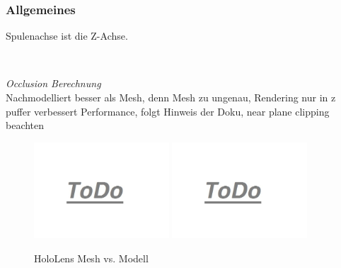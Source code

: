 \subsubsection{Allgemeines}
Spulenachse ist die Z-Achse.
\vspace{8px}
\begin{center}
	\\
\end{center}
\vspace{6px}

\textit{Occlusion Berechnung}\\
Nachmodelliert besser als Mesh, denn Mesh zu ungenau, Rendering nur in z puffer verbessert Performance, folgt Hinweis der Doku, near plane clipping beachten \\
\begin{figure}[H]
	\centering
	\includegraphics[width=0.45\textwidth]{images/todo.jpg}
	\hspace{0.05cm}	
	\includegraphics[width=0.45\textwidth]{images/todo.jpg}
	\caption{HoloLens Mesh vs. Modell}
	\label{img:mesh-vs-model}
\end{figure}

